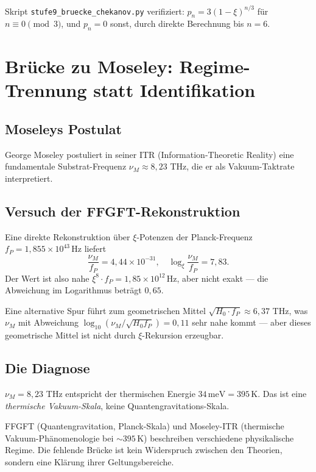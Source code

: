 Skript \texttt{stufe9\_bruecke\_chekanov.py} verifiziert: \(p_n = 3(1-\xi)^{n/3}\) für \(n \equiv 0 \pmod 3\), und \(p_n = 0\) sonst, durch direkte Berechnung bis \(n = 6\).

\section{Brücke zu Moseley: Regime-Trennung statt Identifikation}
\label{sec:moseley}

\subsection{Moseleys Postulat}

George Moseley postuliert in seiner ITR (Information-Theoretic Reality) eine fundamentale Substrat-Frequenz \(\nu_M \approx 8{,}23\) THz, die er als Vakuum-Taktrate interpretiert.

\subsection{Versuch der FFGFT-Rekonstruktion}

Eine direkte Rekonstruktion über \(\xi\)-Potenzen der Planck-Frequenz \(f_P = 1{,}855 \times 10^{43}\,\text{Hz}\) liefert
\begin{equation}
\frac{\nu_M}{f_P} = 4{,}44 \times 10^{-31}, \quad \log_\xi \frac{\nu_M}{f_P} = 7{,}83.
\end{equation}
Der Wert ist also nahe \(\xi^8 \cdot f_P = 1{,}85 \times 10^{12}\,\text{Hz}\), aber nicht exakt — die Abweichung im Logarithmus beträgt \(0{,}65\).

Eine alternative Spur führt zum geometrischen Mittel \(\sqrt{H_0 \cdot f_P} \approx 6{,}37\) THz, was \(\nu_M\) mit Abweichung \(\log_{10}(\nu_M/\sqrt{H_0 f_P}) = 0{,}11\) sehr nahe kommt — aber dieses geometrische Mittel ist nicht durch \(\xi\)-Rekursion erzeugbar.

\subsection{Die Diagnose}

\(\nu_M = 8{,}23\) THz entspricht der thermischen Energie \(34\,\text{meV} = 395\,\text{K}\). Das ist eine \emph{thermische Vakuum-Skala}, keine Quantengravitations-Skala.

\begin{conclusionBox}
FFGFT (Quantengravitation, Planck-Skala) und Moseley-ITR (thermische Vakuum-Phänomenologie bei \(\sim 395\,\text{K}\)) beschreiben verschiedene physikalische Regime. Die fehlende Brücke ist kein Widerspruch zwischen den Theorien, sondern eine Klärung ihrer Geltungsbereiche.
\end{conclusionBox}

